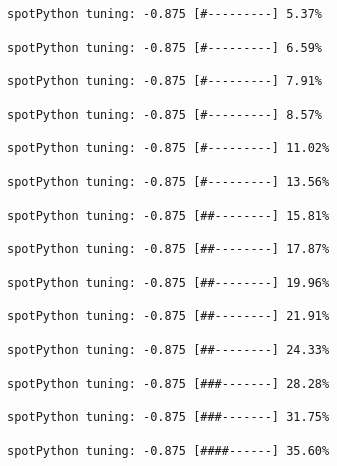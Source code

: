 \documentclass[
  letterpaper,
  DIV=11,
  numbers=noendperiod]{scrreprt}
\begin{document}
\begin{verbatim}
spotPython tuning: -0.875 [#---------] 5.37% 
\end{verbatim}

\begin{verbatim}
spotPython tuning: -0.875 [#---------] 6.59% 
\end{verbatim}

\begin{verbatim}
spotPython tuning: -0.875 [#---------] 7.91% 
\end{verbatim}

\begin{verbatim}
spotPython tuning: -0.875 [#---------] 8.57% 
\end{verbatim}

\begin{verbatim}
spotPython tuning: -0.875 [#---------] 11.02% 
\end{verbatim}

\begin{verbatim}
spotPython tuning: -0.875 [#---------] 13.56% 
\end{verbatim}

\begin{verbatim}
spotPython tuning: -0.875 [##--------] 15.81% 
\end{verbatim}

\begin{verbatim}
spotPython tuning: -0.875 [##--------] 17.87% 
\end{verbatim}

\begin{verbatim}
spotPython tuning: -0.875 [##--------] 19.96% 
\end{verbatim}

\begin{verbatim}
spotPython tuning: -0.875 [##--------] 21.91% 
\end{verbatim}

\begin{verbatim}
spotPython tuning: -0.875 [##--------] 24.33% 
\end{verbatim}

\begin{verbatim}
spotPython tuning: -0.875 [###-------] 28.28% 
\end{verbatim}

\begin{verbatim}
spotPython tuning: -0.875 [###-------] 31.75% 
\end{verbatim}

\begin{verbatim}
spotPython tuning: -0.875 [####------] 35.60% 
\end{verbatim}
\end{document}
